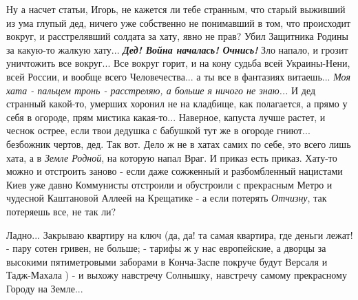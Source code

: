 Ну а насчет статьи, Игорь, не кажется ли тебе странным, что старый выживший из
ума глупый дед, ничего уже собственно не понимавший в том, что происходит
вокруг, и расстрелявший солдата за хату, явно не прав? Убил Защитника Родины за
какую-то жалкую хату... \textbf{\emph{Дед! Война началась! Очнись!}} Зло
напало, и грозит уничтожить все вокруг... Все вокруг горит, и на кону судьба
всей Украины-Нени, всей России, и вообще всего Человечества... а ты все в
фантазиях витаешь... \emph{Моя хата - пальцем тронь - расстреляю, а больше я ничого не знаю...}
И дед странный какой-то, умерших хоронил не на кладбище, как полагается, а
прямо у себя в огороде, прям мистика какая-то... Наверное, капуста лучше
растет, и чеснок острее, если твои дедушка с бабушкой тут же в огороде гниют...
безбожник чертов, дед. Так вот.  Дело ж не в хатах самих по себе, это всего
лишь хата, а в \emph{Земле Родной}, на которую напал Враг. И приказ есть
приказ.  Хату-то можно и отстроить заново - если даже сожженный и разбомбленный
нацистами Киев уже давно Коммунисты отстроили и обустроили с прекрасным Метро и
чудесной Каштановой Аллеей на Крещатике - а если потерять \emph{Отчизну}, так
потеряешь все, не так ли?

Ладно... Закрываю квартиру на ключ (да, да! та самая квартира, где деньги
лежат! - пару сотен гривен, не больше; - тарифы ж у нас европейские, а дворцы
за высокими пятиметровыми заборами в Конча-Заспе покруче будут Версаля и
Тадж-Махала ) - и выхожу навстречу Солнышку, навстречу самому прекрасному
Городу на Земле... 
